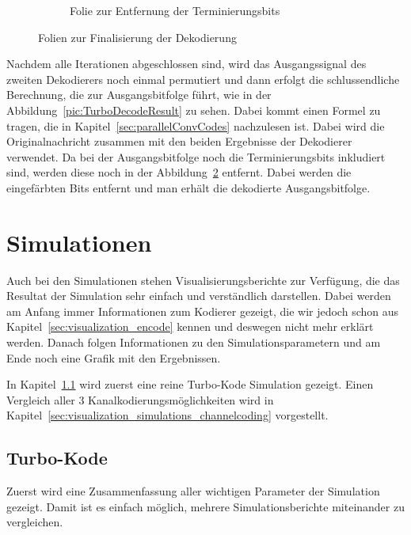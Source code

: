 \begin{figure}[th]
\begin{subfigure}{0.45\textwidth}
	\caption{Folie zur Entfernung der Terminierungsbits}
	\label{pic:TurboDecodeTerminate}
	\end{subfigure}
\caption{Folien zur Finalisierung der Dekodierung}
\end{figure}

Nachdem alle Iterationen abgeschlossen sind, wird das Ausgangssignal des zweiten Dekodierers noch einmal permutiert und dann erfolgt die schlussendliche Berechnung, die zur Ausgangsbitfolge führt, wie in der Abbildung~\ref{pic:TurboDecodeResult} zu sehen. Dabei kommt einen Formel zu tragen, die in Kapitel~\ref{sec:parallelConvCodes} nachzulesen ist. Dabei wird die Originalnachricht zusammen mit den beiden Ergebnisse der Dekodierer verwendet. Da bei der Ausgangsbitfolge noch die Terminierungsbits inkludiert sind, werden diese noch in der Abbildung~\ref{pic:TurboDecodeTerminate} entfernt. Dabei werden die eingefärbten Bits entfernt und man erhält die dekodierte Ausgangsbitfolge.

\FloatBarrier
\section{Simulationen}
\label{sec:visualization_simulation}
Auch bei den Simulationen stehen Visualisierungsberichte zur Verfügung, die das Resultat der Simulation sehr einfach und verständlich darstellen. Dabei werden am Anfang immer Informationen zum Kodierer gezeigt, die wir jedoch schon aus Kapitel~\ref{sec:visualization_encode} kennen und deswegen nicht mehr erklärt werden. Danach folgen Informationen zu den Simulationsparametern und am Ende noch eine Grafik mit den Ergebnissen.

In Kapitel~\ref{sec:visualization_simulations_turbo} wird zuerst eine reine Turbo-Kode Simulation gezeigt. Einen Vergleich aller 3 Kanalkodierungsmöglichkeiten wird in Kapitel~\ref{sec:visualization_simulations_channelcoding} vorgestellt.

\FloatBarrier
\subsection{Turbo-Kode}
\label{sec:visualization_simulations_turbo}
Zuerst wird eine Zusammenfassung aller wichtigen Parameter der Simulation gezeigt. Damit ist es einfach möglich, mehrere Simulationsberichte miteinander zu vergleichen.

